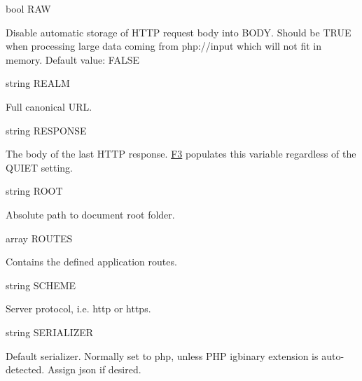 {\ttfamily bool R\+AW}


\begin{DoxyItemize}
\item Disable automatic storage of H\+T\+TP request body into {\ttfamily B\+O\+DY}. Should be T\+R\+UE when processing large data coming from {\ttfamily php\+://input} which will not fit in memory. Default value\+: {\ttfamily F\+A\+L\+SE}
\end{DoxyItemize}

{\ttfamily string R\+E\+A\+LM}


\begin{DoxyItemize}
\item Full canonical U\+RL.
\end{DoxyItemize}

{\ttfamily string R\+E\+S\+P\+O\+N\+SE}


\begin{DoxyItemize}
\item The body of the last H\+T\+TP response. \hyperlink{class_f3}{F3} populates this variable regardless of the {\ttfamily Q\+U\+I\+ET} setting.
\end{DoxyItemize}

{\ttfamily string R\+O\+OT}


\begin{DoxyItemize}
\item Absolute path to document root folder.
\end{DoxyItemize}

{\ttfamily array R\+O\+U\+T\+ES}


\begin{DoxyItemize}
\item Contains the defined application routes.
\end{DoxyItemize}

{\ttfamily string S\+C\+H\+E\+ME}


\begin{DoxyItemize}
\item Server protocol, i.\+e. {\ttfamily http} or {\ttfamily https}.
\end{DoxyItemize}

{\ttfamily string S\+E\+R\+I\+A\+L\+I\+Z\+ER}


\begin{DoxyItemize}
\item Default serializer. Normally set to {\ttfamily php}, unless P\+HP {\ttfamily igbinary} extension is auto-\/detected. Assign {\ttfamily json} if desired.
\end{DoxyItemize}

